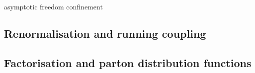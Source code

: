 
asymptotic freedom
confinement

\subsection{Renormalisation and running coupling}
\subsection{Factorisation and parton distribution functions}
